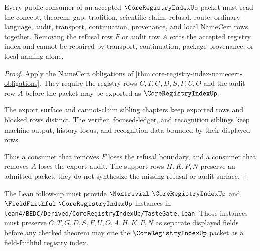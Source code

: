 \begin{theorem}
\label{thm:core-registry-index-nonescape}
Every public consumer of an accepted $\CoreRegistryIndexUp$ packet must read the concept, theorem, gap, tradition, scientific-claim, refusal, route, ordinary-language, audit, transport, continuation, provenance, and local NameCert rows together. Removing the refusal row $F$ or audit row $A$ exits the accepted registry index and cannot be repaired by transport, continuation, package provenance, or local naming alone.
\end{theorem}
\begin{proof}
Apply the NameCert obligations of \autoref{thm:core-registry-index-namecert-obligations}. They require the registry rows $C,T,G,D,S,F,U,O$ and the audit row $A$ before the packet may be exported as $\CoreRegistryIndexUp$.

The export surface and cannot-claim sibling chapters keep exported rows and blocked rows distinct. The verifier, focused-ledger, and recognition siblings keep machine-output, history-focus, and recognition data bounded by their displayed rows.

Thus a consumer that removes $F$ loses the refusal boundary, and a consumer that removes $A$ loses the export audit. The support rows $H,K,P,N$ preserve an admitted packet; they do not synthesize the missing refusal or audit surface.
\end{proof}



The Lean follow-up must provide $\Nontrivial\ \CoreRegistryIndexUp$ and $\FieldFaithful\ \CoreRegistryIndexUp$ instances in \texttt{lean4/BEDC/Derived/CoreRegistryIndexUp/TasteGate.lean}. Those instances must preserve $C,T,G,D,S,F,U,O,A,H,K,P,N$ as separate displayed fields before any checked theorem may cite the $\CoreRegistryIndexUp$ packet as a field-faithful registry index.

